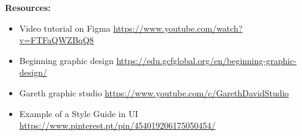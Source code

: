 \textbf{Resources:}

\begin{itemize}
\item Video tutorial on Figma \url{https://www.youtube.com/watch?v=FTFaQWZBqQ8}
\item Beginning graphic design \url{https://edu.gcfglobal.org/en/beginning-graphic-design/}
\item Gareth graphic studio \url{https://www.youtube.com/c/GarethDavidStudio}
\item Example of a Style Guide in UI \url{https://www.pinterest.pt/pin/454019206175050454/}
\end{itemize}

